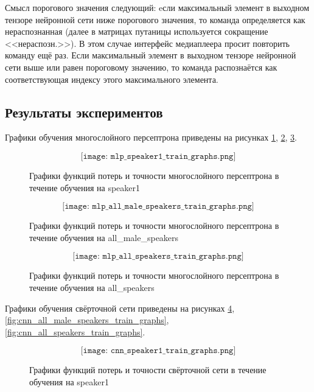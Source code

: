 Смысл порогового значения следующий: eсли максимальный элемент в выходном тензоре нейронной сети ниже порогового значения, то команда определяется как нераспознанная (далее в матрицах путаницы используется сокращение <<нераспозн.>>). В этом случае интерфейс медиаплеера просит повторить команду ещё раз. Если максимальный элемент в выходном тензоре нейронной сети выше или равен пороговому значению, то команда распознаётся как соответствующая индексу этого максимального элемента. 

\newpage
\subsection{Результаты экспериментов}
Графики обучения многослойного персептрона приведены на рисунках \ref{fig:mlp_speaker1_train_graphs}, \ref{fig:mlp_all_male_speakers_train_graphs}, \ref{fig:mlp_all_speakers_train_graphs}.

\begin{figure}[H]
	\[\texttt{[image: mlp\_speaker1\_train\_graphs.png]}\]
	\caption{Графики функций потерь и точности многослойного персептрона в течение обучения на speaker1}
	\label{fig:mlp_speaker1_train_graphs}
\end{figure}

\begin{figure}[H]
	\[\texttt{[image: mlp\_all\_male\_speakers\_train\_graphs.png]}\]
	\caption{Графики функций потерь и точности многослойного персептрона в течение обучения на all\_male\_speakers}
	\label{fig:mlp_all_male_speakers_train_graphs}
\end{figure}

\begin{figure}[H]
	\[\texttt{[image: mlp\_all\_speakers\_train\_graphs.png]}\]
	\caption{Графики функций потерь и точности многослойного персептрона в течение обучения на all\_speakers}
	\label{fig:mlp_all_speakers_train_graphs}
\end{figure}


Графики обучения свёрточной сети приведены на рисунках \ref{fig:cnn_speaker1_train_graphs}, \ref{fig:cnn_all_male_speakers_train_graphs}, \ref{fig:cnn_all_speakers_train_graphs}.

\begin{figure}[H]
	\[\texttt{[image: cnn\_speaker1\_train\_graphs.png]}\]
	\caption{Графики функций потерь и точности свёрточной сети в течение обучения на speaker1}
	\label{fig:cnn_speaker1_train_graphs}
\end{figure}


